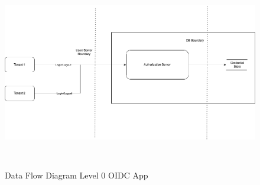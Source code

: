 \begin{figure}[h!]
\centering
\caption{Data Flow Diagram Level 0 OIDC App}\label{fig:dfd_app}
\includegraphics[width=\textwidth, height=320px]{pics/DFD_APP.png}
\end{figure}


\label{subsec:stride}
